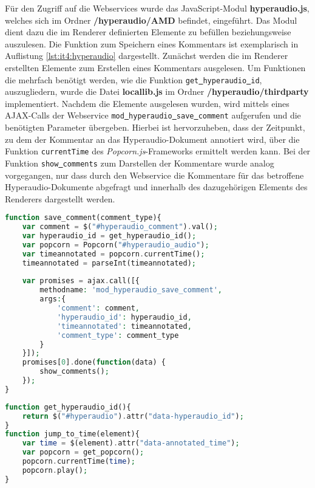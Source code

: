 Für den Zugriff auf die Webservices wurde das JavaScript-Modul \textbf{hyperaudio.js}, welches sich im Ordner \textbf{/hyperaudio/AMD} befindet, eingeführt. Das Modul dient dazu die im Renderer definierten Elemente zu befüllen beziehungsweise auszulesen.
Die Funktion zum Speichern eines Kommentars ist exemplarisch in Auflistung \ref{lst:it4:hyperaudio} dargestellt. Zunächst werden die im Renderer erstellten Elemente zum Erstellen eines Kommentars ausgelesen. Um Funktionen die mehrfach benötigt werden, wie die Funktion \texttt{get\underline{{ }}hyperaudio\underline{{ }}id},  auszugliedern, wurde die Datei \textbf{locallib.js} im Ordner \mbox{\textbf{/hyperaudio/thirdparty}} implementiert. Nachdem die Elemente ausgelesen wurden, wird mittels eines AJAX-Calls der Webservice \texttt{mod\underline{{ }}hyperaudio\underline{{ }}save\underline{{ }}comment} aufgerufen und die benötigten Parameter übergeben. Hierbei ist hervorzuheben, dass der Zeitpunkt, zu dem der Kommentar an das Hyperaudio-Dokument annotiert wird, über die Funktion \texttt{currentTime} des \textit{Popcorn.js}-Frameworks ermittelt werden kann. Bei der Funktion \texttt{show\underline{{ }}comments} zum Darstellen der Kommentare wurde analog vorgegangen, nur dass durch den Webservice die Kommentare für das betroffene Hyperaudio-Dokumente abgefragt und innerhalb des dazugehörigen Elements des Renderers dargestellt werden.


\begin{lstlisting}[language=php,
             linewidth=\textwidth,
             caption={Ausschnitt der \textbf{hyperaudio.js} in der 4. Iteration},
             label={lst:it4:hyperaudio}]
function save_comment(comment_type){
    var comment = $("#hyperaudio_comment").val();
    var hyperaudio_id = get_hyperaudio_id();
    var popcorn = Popcorn("#hyperaudio_audio");
    var timeannotated = popcorn.currentTime();
    timeannotated = parseInt(timeannotated);
	    
    var promises = ajax.call([{
        methodname: 'mod_hyperaudio_save_comment',
        args:{
            'comment': comment,
            'hyperaudio_id': hyperaudio_id,       
            'timeannotated': timeannotated,
            'comment_type': comment_type
        }
    }]);
    promises[0].done(function(data) {
        show_comments();
    });
}
\end{lstlisting}

\begin{lstlisting}[language=php,
             linewidth=\textwidth,
             caption={Ausschnitt der \textbf{locallib.js} in der 4. Iteration},
             label={lst:it4:locallib.js}]
function get_hyperaudio_id(){
    return $("#hyperaudio").attr("data-hyperaudio_id");
}
function jump_to_time(element){
    var time = $(element).attr("data-annotated_time");
    var popcorn = get_popcorn();
    popcorn.currentTime(time);
    popcorn.play();
}
\end{lstlisting}

